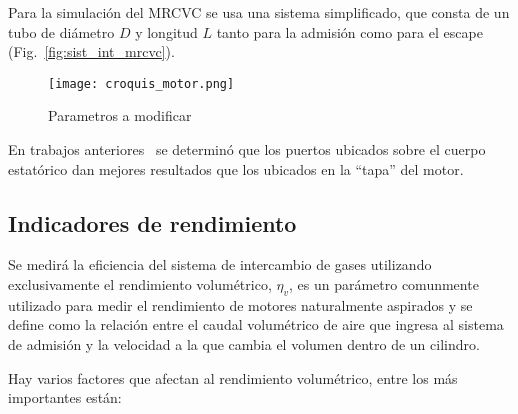 Para la simulación del MRCVC se usa una sistema simplificado, que consta de un
tubo de diámetro $D$ y longitud $L$ tanto para la admisión como para el escape
(Fig.~\ref{fig:sist_int_mrcvc}).


\begin{figure}
    \centering
    \texttt{[image: croquis\_motor.png]}
    \caption{Parametros a modificar}\label{fig:croquis_mrcvc}
\end{figure}

En trabajos anteriores~\cite{chiquito} se determinó que los puertos ubicados
sobre el cuerpo estatórico dan mejores resultados que los ubicados en la
``tapa'' del motor.

\subsection{Indicadores de rendimiento}\label{sec:indicadores_rendimiento}

Se medirá la eficiencia del sistema de intercambio de gases utilizando
exclusivamente el rendimiento volumétrico, $\eta_v$, es un parámetro comunmente
utilizado para medir el rendimiento de motores naturalmente aspirados y se
define como la relación entre el caudal volumétrico de aire que ingresa al
sistema de admisión y la velocidad a la que cambia el volumen dentro de un
cilindro.




%
Hay varios factores que afectan al rendimiento volumétrico, entre los más
importantes están:


